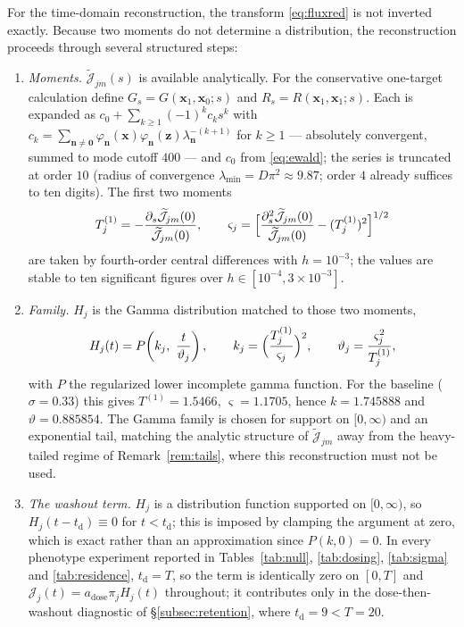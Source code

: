 \documentclass[pdflatex,sn-mathphys-num]{sn-jnl}
\numberwithin{equation}{section}
\theoremstyle{thmstyleone}%
\theoremstyle{definition}
\theoremstyle{remark}
\begin{document}
For the time-domain reconstruction, the transform \eqref{eq:fluxred} is not inverted exactly. Because two moments do not determine a distribution, the reconstruction proceeds through several structured steps:
\begin{enumerate}[label=(\roman*)]
\item \emph{Moments.} $\widetilde{\mathcal J}_{jm}(s)$ is available analytically.
For the conservative one-target calculation define $G_s=G(\mathbf x_1,\mathbf x_0;s)$ and $R_s=R(\mathbf x_1,\mathbf x_1;s)$. Each is expanded as $c_0+\sum_{k\ge1}(-1)^kc_ks^k$ with $c_k=\sum_{\mathbf n\neq\mathbf 0} \varphi_{\mathbf n}(\mathbf x)\varphi_{\mathbf n}(\mathbf z) \lambda_{\mathbf n}^{-(k+1)}$ for $k\ge1$ --- absolutely convergent, summed to mode cutoff $400$ --- and $c_0$ from \eqref{eq:ewald}; the series is truncated at order $10$ (radius of convergence $\lambda_{\min}=D\pi^2\approx9.87$; order $4$ already suffices to ten digits). The first two moments
\[
T^{(1)}_j=-\frac{\partial_s\widetilde{\mathcal J}_{jm}(0)}
{\widetilde{\mathcal J}_{jm}(0)},\qquad
\varsigma_j=\Bigl[\frac{\partial_s^2\widetilde{\mathcal J}_{jm}(0)}
{\widetilde{\mathcal J}_{jm}(0)}-(T^{(1)}_j)^2\Bigr]^{1/2}
\]
are taken by fourth-order central differences with $h=10^{-3}$; the values are stable to ten significant figures over $h\in[10^{-4},3\times10^{-3}]$. 
\item \emph{Family.} $H_j$ is the Gamma distribution matched to those two moments,
\begin{equation}
H_j(t)=P\!\left(k_j,\ \frac{t}{\vartheta_j}\right),\qquad
k_j=\Bigl(\frac{T^{(1)}_j}{\varsigma_j}\Bigr)^{2},\qquad
\vartheta_j=\frac{\varsigma_j^{2}}{T^{(1)}_j},
\label{eq:gammafit}
\end{equation}
with $P$ the regularized lower incomplete gamma function. For the baseline ($\sigma=0.33$) this gives $T^{(1)}=1.5466$, $\varsigma=1.1705$, hence $k=1.745888$ and $\vartheta=0.885854$. The Gamma family is chosen for support on $[0,\infty)$ and an exponential tail, matching the analytic structure of $\widetilde{\mathcal J}_{jm}$ away from the heavy-tailed regime of Remark~\ref{rem:tails}, where this reconstruction must not be used. 
\item \emph{The washout term.} $H_j$ is a distribution function supported on $[0,\infty)$, so $H_j(t-t_{\mathrm d})\equiv0$ for $t<t_{\mathrm d}$; this is imposed by clamping the argument at zero, which is exact rather than an approximation since $P(k,0)=0$. In every phenotype experiment reported in Tables~\ref{tab:null}, \ref{tab:dosing}, \ref{tab:sigma} and \ref{tab:residence}, $t_{\mathrm d}=T$, so the term is identically zero on $[0,T]$ and $\mathcal J_j(t)=a_{\mathrm{dose}}\pi_jH_j(t)$ throughout; it contributes only in the dose-then-washout diagnostic of \S\ref{subsec:retention}, where $t_{\mathrm d}=9<T=20$.

\end{enumerate}
\end{document}

